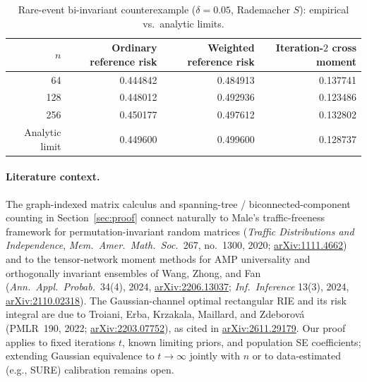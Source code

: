 \documentclass[11pt]{article}
\theoremstyle{plain}
\theoremstyle{definition}
\theoremstyle{remark}
\begin{document}
\begin{table}[ht]
\centering
\caption{Rare-event bi-invariant counterexample ($\delta = 0.05$, Rademacher $S$): empirical vs.\ analytic limits.}
\label{tab:rare}
\smallskip
\begin{tabular}{@{}rrrr@{}}
\toprule
$n$ & Ordinary reference risk & Weighted reference risk & Iteration-$2$ cross moment \\
\midrule
64  & 0.444842 & 0.484913 & 0.137741 \\
128 & 0.448012 & 0.492936 & 0.123486 \\
256 & 0.450177 & 0.497612 & 0.132802 \\
\midrule
Analytic limit & 0.449600 & 0.499600 & 0.128737 \\
\bottomrule
\end{tabular}
\end{table}

\paragraph{Literature context.}
The graph-indexed matrix calculus and spanning-tree / biconnected-component counting in Section~\ref{sec:proof} connect naturally to Male's traffic-freeness framework for permutation-invariant random matrices (\emph{Traffic Distributions and Independence}, \emph{Mem.\ Amer.\ Math.\ Soc.}\ 267, no.~1300, 2020; \href{https://arxiv.org/abs/1111.4662}{arXiv:1111.4662}) and to the tensor-network moment methods for AMP universality and orthogonally invariant ensembles of Wang, Zhong, and Fan (\emph{Ann.\ Appl.\ Probab.}\ 34(4), 2024, \href{https://arxiv.org/abs/2206.13037}{arXiv:2206.13037}; \emph{Inf.\ Inference} 13(3), 2024, \href{https://arxiv.org/abs/2110.02318}{arXiv:2110.02318}).
The Gaussian-channel optimal rectangular RIE and its risk integral are due to Troiani, Erba, Krzakala, Maillard, and Zdeborov\'a (PMLR~190, 2022; \href{https://arxiv.org/abs/2203.07752}{arXiv:2203.07752}), as cited in \href{https://arxiv.org/abs/2611.29179}{arXiv:2611.29179}.
Our proof applies to fixed iterations $t$, known limiting priors, and population SE coefficients; extending Gaussian equivalence to $t \to \infty$ jointly with $n$ or to data-estimated (e.g., SURE) calibration remains open.
\end{document}
